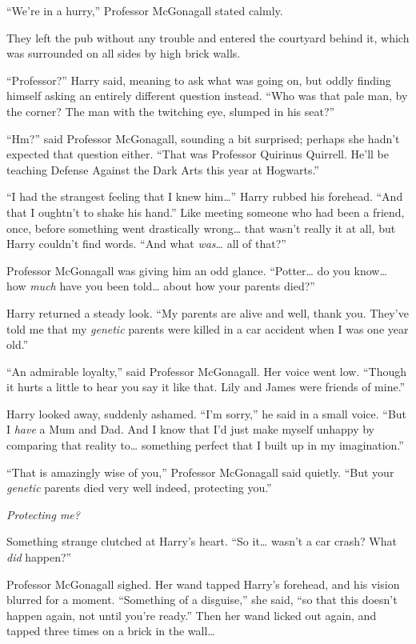 “We’re in a hurry,” Professor McGonagall stated calmly.

They left the pub without any trouble and entered the courtyard
behind it, which was surrounded on all sides by high brick walls.

“Professor?” Harry said, meaning to ask what was going on, but oddly
finding himself asking an entirely different question instead.
“Who was that pale man, by the corner? The man with
the twitching eye, slumped in his seat?”

“Hm?” said Professor McGonagall, sounding a bit surprised; perhaps she hadn’t
expected that question either. “That was Professor Quirinus Quirrell. He’ll be
teaching Defense Against the Dark Arts this year at Hogwarts.”

“I had the strangest feeling that I knew him…” Harry rubbed his
forehead. “And that I oughtn’t to shake his hand.” Like meeting someone
who had been a friend, once, before something went drastically wrong…
that wasn’t really it at all, but Harry couldn’t find words. “And what
\emph{was}… all of that?”

Professor McGonagall was giving him an odd glance. “Potter… do you
know… how \emph{much} have you been told… about how your parents
died?”

Harry returned a steady look. “My parents are alive and
well, thank you. They’ve told me that my \emph{genetic} parents
were killed in a car accident when I was one year old.”

“An admirable loyalty,” said Professor McGonagall. Her voice went low. “Though
it hurts a little to hear you say it like that. Lily and James were friends of
mine.”

Harry looked away, suddenly ashamed. “I’m sorry,” he said in a small voice.
“But I \emph{have} a Mum and Dad. And I know that I’d just make myself unhappy
by comparing that reality to… something perfect that I built up in my
imagination.”

“That is amazingly wise of you,” Professor McGonagall said quietly. “But your
\emph{genetic} parents died very well indeed, protecting you.”

\emph{Protecting me?}

Something strange clutched at Harry’s heart. “So it…
wasn’t a car crash? What \emph{did} happen?”

Professor McGonagall sighed. Her wand tapped Harry’s forehead, and his vision
blurred for a moment. “Something of a disguise,” she said, “so that this
doesn’t happen again, not until you’re ready.” Then her wand licked out again,
and tapped three times on a brick in the wall…

